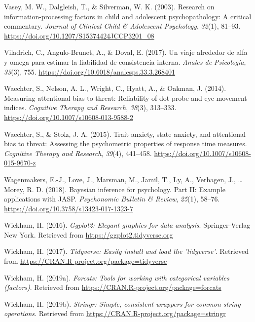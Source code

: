 \documentclass[english,,man,floatsintext]{apa6}
\begin{document}
\leavevmode\hypertarget{ref-vasey_research_2003}{}%
Vasey, M. W., Dalgleish, T., \& Silverman, W. K. (2003). Research on information-processing factors in child and adolescent psychopathology: A critical commentary. \emph{Journal of Clinical Child \& Adolescent Psychology}, \emph{32}(1), 81--93. \url{https://doi.org/10.1207/S15374424JCCP3201_08}

\leavevmode\hypertarget{ref-viladrich_viaje_2017}{}%
Viladrich, C., Angulo-Brunet, A., \& Doval, E. (2017). Un viaje alrededor de alfa y omega para estimar la fiabilidad de consistencia interna. \emph{Anales de Psicología}, \emph{33}(3), 755. \url{https://doi.org/10.6018/analesps.33.3.268401}

\leavevmode\hypertarget{ref-waechter_measuring_2014}{}%
Waechter, S., Nelson, A. L., Wright, C., Hyatt, A., \& Oakman, J. (2014). Measuring attentional bias to threat: Reliability of dot probe and eye movement indices. \emph{Cognitive Therapy and Research}, \emph{38}(3), 313--333. \url{https://doi.org/10.1007/s10608-013-9588-2}

\leavevmode\hypertarget{ref-waechter_trait_2015}{}%
Waechter, S., \& Stolz, J. A. (2015). Trait anxiety, state anxiety, and attentional bias to threat: Assessing the psychometric properties of response time measures. \emph{Cognitive Therapy and Research}, \emph{39}(4), 441--458. \url{https://doi.org/10.1007/s10608-015-9670-z}

\leavevmode\hypertarget{ref-wagenmakers_bayesian_2018-2}{}%
Wagenmakers, E.-J., Love, J., Marsman, M., Jamil, T., Ly, A., Verhagen, J., \ldots{} Morey, R. D. (2018). Bayesian inference for psychology. Part II: Example applications with JASP. \emph{Psychonomic Bulletin \& Review}, \emph{25}(1), 58--76. \url{https://doi.org/10.3758/s13423-017-1323-7}

\leavevmode\hypertarget{ref-R-ggplot2}{}%
Wickham, H. (2016). \emph{Ggplot2: Elegant graphics for data analysis}. Springer-Verlag New York. Retrieved from \url{https://ggplot2.tidyverse.org}

\leavevmode\hypertarget{ref-R-tidyverse}{}%
Wickham, H. (2017). \emph{Tidyverse: Easily install and load the 'tidyverse'}. Retrieved from \url{https://CRAN.R-project.org/package=tidyverse}

\leavevmode\hypertarget{ref-R-forcats}{}%
Wickham, H. (2019a). \emph{Forcats: Tools for working with categorical variables (factors)}. Retrieved from \url{https://CRAN.R-project.org/package=forcats}

\leavevmode\hypertarget{ref-R-stringr}{}%
Wickham, H. (2019b). \emph{Stringr: Simple, consistent wrappers for common string operations}. Retrieved from \url{https://CRAN.R-project.org/package=stringr}
\end{document}
